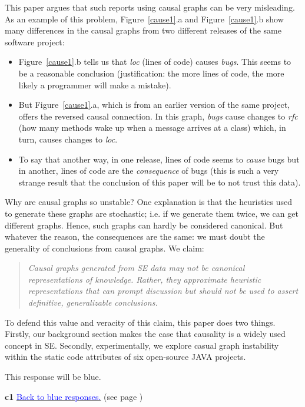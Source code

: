 \documentclass[]{svjour3}
\newif\ifblueresponse
\newcommand{\there}[2]{%
  \textbf{#1} \hyperlink{#1}{\textcolor{blue}{#2}} (see page \pageref{#1})%
}
\newcommand{\here}[2]{%
  \hypertarget{#1}{%
    \ifblueresponse
      \textbf{#1} \textcolor{blue}{#2}%
    \else
      #2%
    \fi
  }%
  \label{#1}%
}
\begin{document}
This paper argues that such reports using causal graphs can be very misleading.  
    As an example of this problem,
 Figure~\ref{cause1}.a and Figure~\ref{cause1}.b show many differences  in the causal graphs from two different releases of the same software project:
 \begin{itemize}
     \item 
  Figure~\ref{cause1}.b tells us that {\em loc} (lines of code) causes {\em bugs}. This seems to be a reasonable conclusion (justification:   the more lines of code, the more likely a programmer will make a mistake).
  \item  
      But  Figure~\ref{cause1}.a, which is from an earlier version of the same project, offers the reversed causal connection. In this graph, {\em bugs} cause changes to {\em rfc} (how many methods wake up when a message arrives at a class)  which, in turn, causes changes to {\em loc}. 
      \item  To say that another way, in one release, lines of code seems to {\em cause} bugs
 but in another, lines of code are the {\em consequence} of bugs (this is such a  very strange result that the conclusion
 of this paper will be to not trust  this data).
      \end{itemize}
Why are causal graphs so unstable? One explanation is that the heuristics used to generate these graphs are stochastic; i.e. if we generate them twice, we can get different graphs. Hence, such graphs can hardly be considered canonical. But whatever the reason, the consequences are the same: we must doubt the generality of conclusions from causal graphs. We claim:
  \begin{quote} {\em Causal graphs generated from SE data
    may not be canonical representations of knowledge. Rather, they approximate heuristic representations that can prompt discussion but should not be used to assert definitive, generalizable conclusions.}
    \end{quote}  
To defend this value and veracity of this claim, this paper does two things. Firstly, 
our background section makes the case that causality is a widely used concept in SE.  
Secondly, experimentally, we explore casual graph instability within the static code
attributes of six open-source JAVA projects.

\here{c1}{This response will be blue.}



\there{c1}{Back to blue responses.}
\end{document}
